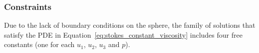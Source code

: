 \subsubsection{Constraints} 
Due to the lack of boundary conditions on the sphere, the family of solutions that satisfy the PDE in Equation~\ref{eq:stokes_constant_viscosity} includes four free constants (one for each $u_1$, $u_2$, $u_3$ and $p$). 


